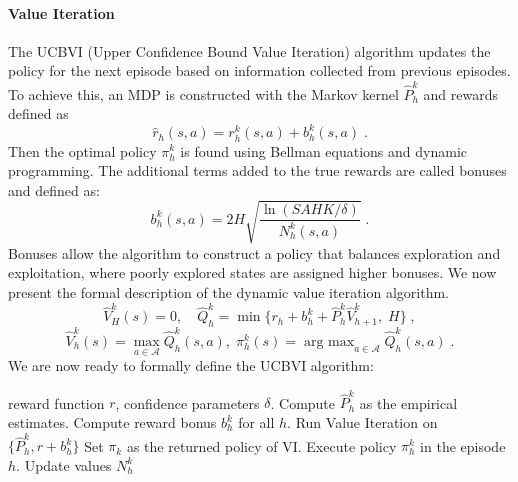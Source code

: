 \documentclass{article}
\numberwithin{equation}{section}
\newcommand{\cA}{\mathcal{A}}
\newcommand{\eqsp}{\;}
\DeclareMathOperator*{\argmax}{arg\ max}
\begin{document}
\paragraph{Value Iteration}
The UCBVI (Upper Confidence Bound Value Iteration) algorithm updates the policy for the next episode based on information collected from previous episodes. To achieve this, an MDP is constructed with the Markov kernel \( \widehat{P}_h^k \) and rewards defined as  
\[
\widehat{r}_h(s,a) = r_h^k(s,a) + b_h^k(s,a)\eqsp.
\]  
Then the optimal policy \( \pi_h^k \) is found using Bellman equations and dynamic programming. The additional terms added to the true rewards are called bonuses and defined as:  
\begin{equation}\label{eq:hoeffding_bonus}
b_h^k(s,a) = 2H\sqrt{\frac{\ln{(SAHK/\delta)}}{N_h^k(s,a)}}\eqsp.
\end{equation} 
Bonuses allow the algorithm to construct a policy that balances exploration and exploitation, where poorly explored states are assigned higher bonuses. We now present the formal description of the dynamic value iteration algorithm.
\[\widehat{V}_H^k(s) = 0, \quad \widehat{Q}_h^k =\min \{ r_h + b_h^k + \widehat{P}_h^k  \widehat{V}_{h+1}^{k}, \; H\}\eqsp,\]
\begin{equation}\label{dp_eq_2}
    \widehat{V}_h^k(s) = \max_{a\in\cA}\widehat{Q}_h^k(s,a), \;  \pi_h^k(s) = \argmax_{a\in\cA} \widehat{Q}_h^k(s,a)\eqsp.
\end{equation}
We are now ready to formally define the UCBVI algorithm:
\begin{algorithm}
	\caption{UCBVI}
	\begin{algorithmic}[1]\label{alg:ucbvi}
		\REQUIRE reward function \(r\), confidence parameters \(\delta\).
            \STATE Compute \(\widehat{P}_h^k\) as the empirical estimates.
            \STATE Compute reward bonus \(b_h^k\) for all \(h\).
            Run Value Iteration on \(\{\widehat{P}_h^k, r + b_h^k\}\)
            Set \(\pi_k\) as the returned policy of VI.
            \STATE Execute policy \(\pi_h^k\) in the episode \(h\). Update values \(N_h^k\)
        \ENDFOR
	\end{algorithmic}	
\end{algorithm}
\end{document}
